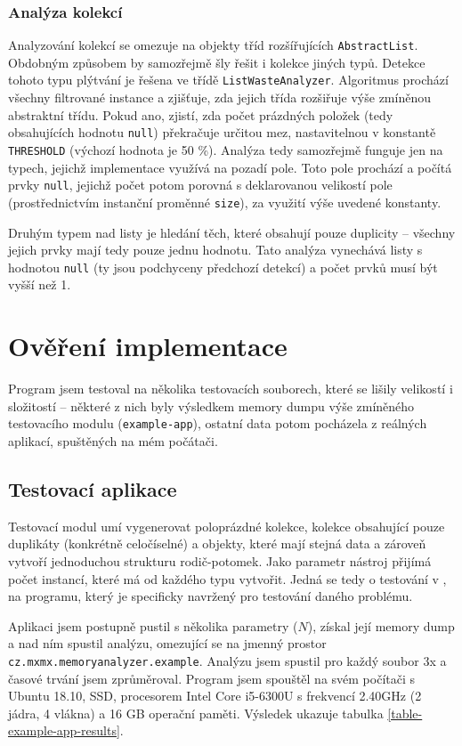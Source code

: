 \subsection{Analýza kolekcí}
Analyzování kolekcí se omezuje na objekty tříd rozšířujících \texttt{AbstractList}. Obdobným způsobem by samozřejmě šly řešit i kolekce jiných typů. Detekce tohoto typu plýtvání je řešena ve třídě \texttt{ListWasteAnalyzer}. Algoritmus prochází všechny filtrované instance a zjišťuje, zda jejich třída rozšiřuje výše zmíněnou abstraktní třídu. Pokud ano, zjistí, zda počet prázdných položek (tedy obsahujících hodnotu \texttt{null}) překračuje určitou mez, nastavitelnou v konstantě \texttt{THRESHOLD} (výchozí hodnota je 50 \%). Analýza tedy samozřejmě funguje jen na typech, jejichž implementace využívá na pozadí pole. Toto pole prochází a počítá prvky \texttt{null}, jejichž počet potom porovná s deklarovanou velikostí pole (prostřednictvím instanční proměnné \texttt{size}), za využití výše uvedené konstanty.

Druhým typem nad listy je hledání těch, které obsahují pouze duplicity -- všechny jejich prvky mají tedy pouze jednu hodnotu. Tato analýza vynechává listy s hodnotou \texttt{null} (ty jsou podchyceny předchozí detekcí) a počet prvků musí být vyšší než 1.

\chapter{Ověření implementace}
Program jsem testoval na několika testovacích souborech, které se lišily velikostí i složitostí -- některé z nich byly výsledkem memory dumpu výše zmíněného testovacího modulu (\texttt{example-app}), ostatní data potom pocházela z reálných aplikací, spuštěných na mém počátači. 

\section{Testovací aplikace}
Testovací modul umí vygenerovat poloprázdné kolekce, kolekce obsahující pouze duplikáty (konkrétně celočíselné) a objekty, které mají stejná data a zároveň vytvoří jednoduchou strukturu rodič-potomek. Jako parametr nástroj přijímá počet instancí, které má od každého typu vytvořit. Jedná se tedy o testování v , na programu, který je specificky navržený pro testování daného problému.

Aplikaci jsem postupně pustil s několika parametry ($N$), získal její memory dump a nad ním spustil analýzu, omezující se na jmenný prostor \texttt{cz.mx\-mx.me\-mory\-analyzer.e\-xa\-mple}. Analýzu jsem spustil pro každý soubor 3x a časové trvání jsem zprůměroval. Program jsem spouštěl na svém počítači s Ubuntu 18.10, SSD, procesorem Intel Core i5-6300U s frekvencí 2.40GHz (2 jádra, 4 vlákna) a 16 GB operační paměti. Výsledek ukazuje tabulka \ref{table-example-app-results}.

